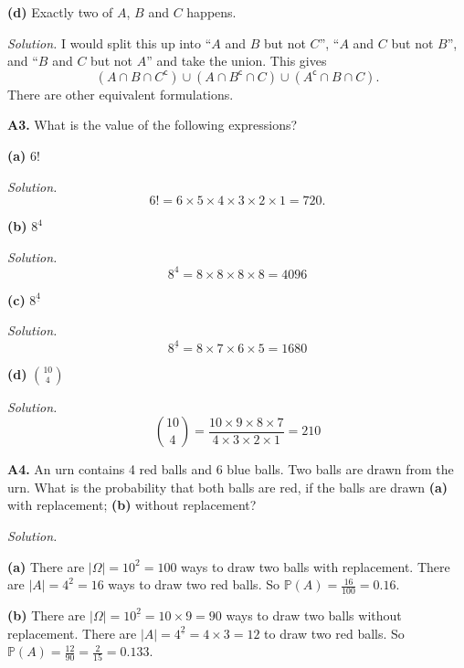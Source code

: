 \documentclass[
  a4paper,
]{book}
\theoremstyle{definition}
\theoremstyle{definition}
\theoremstyle{definition}
\theoremstyle{definition}
\theoremstyle{remark}
\begin{document}
\textbf{(d)} Exactly two of \(A\), \(B\) and \(C\) happens.

\begin{myanswers}
\emph{Solution.} I would split this up into ``\(A\) and \(B\) but not \(C\)'', ``\(A\) and \(C\) but not \(B\)'', and ``\(B\) and \(C\) but not \(A\)'' and take the union. This gives
\[  (A \cap B \cap C^{\mathsf{c}}) \cup (A \cap B^{\mathsf{c}} \cap C) \cup (A^{\mathsf{c}} \cap B \cap C) . \]
There are other equivalent formulations.

\end{myanswers}

\textbf{A3.} What is the value of the following expressions?

\textbf{(a)} \(6!\)

\begin{myanswers}
\emph{Solution.}
\[ 6! = 6 \times 5 \times 4 \times 3 \times 2 \times 1 = 720. \]

\end{myanswers}

\textbf{(b)} \(8^4\)

\begin{myanswers}
\emph{Solution.}
\[ 8^4 = 8 \times 8 \times 8 \times 8 = 4096 \]

\end{myanswers}

\textbf{(c)} \({8}^{\underline{4}}\)

\begin{myanswers}
\emph{Solution.}
\[ {8}^{\underline{4}} = 8 \times 7 \times 6 \times 5 = 1680 \]

\end{myanswers}

\textbf{(d)} \({\displaystyle \binom{10}{4}}\)

\begin{myanswers}
\emph{Solution.}
\[ \binom{10}{4} = \frac{10 \times 9 \times 8 \times 7}{4\times 3\times 2\times 1} = 210 \]

\end{myanswers}

\textbf{A4.} An urn contains 4 red balls and 6 blue balls. Two balls are drawn from the urn. What is the probability that both balls are red, if the balls are drawn \textbf{(a)} with replacement; \textbf{(b)} without replacement?

\begin{myanswers}
\emph{Solution.}

\textbf{(a)} There are \(|\Omega| = 10^2 = 100\) ways to draw two balls with replacement. There are \(|A| = 4^2=16\) ways to draw two red balls. So
\(\mathbb P(A) = \frac{16}{100} = 0.16\).

\textbf{(b)} There are \(|\Omega| = {10}^{\underline{2}} = 10 \times 9 = 90\) ways to draw two balls without replacement. There are \(|A| = {4}^{\underline{2}} = 4 \times 3 = 12\) to draw two red balls. So
\(\mathbb P(A) = \frac{12}{90} = \frac{2}{15} = 0.133\).

\end{myanswers}
\end{document}
